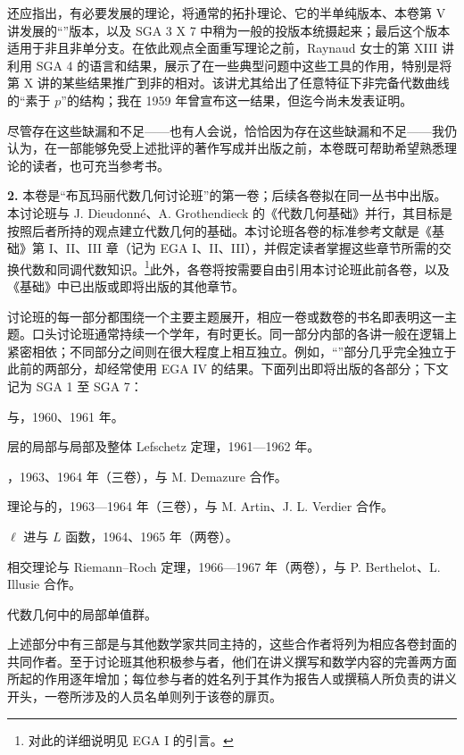还应指出，有必要发展的理论，将通常的拓扑理论、它的半单纯版本、本卷第 V 讲发展的“”版本，以及 SGA 3 X 7 中稍为一般的投版本统摄起来；最后这个版本适用于非且非单分支。在依此观点全面重写理论之前，Raynaud 女士的第 XIII 讲利用 SGA 4 的语言和结果，展示了在一些典型问题中这些工具的作用，特别是将第 X 讲的某些结果推广到非的相对。该讲尤其给出了任意特征下非完备代数曲线的“素于 $p$”的结构；我在 1959 年曾宣布这一结果，但迄今尚未发表证明。

尽管存在这些缺漏和不足——也有人会说，恰恰因为存在这些缺漏和不足——我仍认为，在一部能够免受上述批评的著作写成并出版之前，本卷既可帮助希望熟悉理论的读者，也可充当参考书。

\textbf{2.} 本卷是“布瓦玛丽代数几何讨论班”的第一卷；后续各卷拟在同一丛书中出版。本讨论班与 J. Dieudonné、A. Grothendieck 的《代数几何基础》并行，其目标是按照后者所持的观点建立代数几何的基础。本讨论班各卷的标准参考文献是《基础》第 I、II、III 章（记为 EGA I、II、III），并假定读者掌握这些章节所需的交换代数和同调代数知识。\footnote{对此的详细说明见 EGA I 的引言。}此外，各卷将按需要自由引用本讨论班此前各卷，以及《基础》中已出版或即将出版的其他章节。

讨论班的每一部分都围绕一个主要主题展开，相应一卷或数卷的书名即表明这一主题。口头讨论班通常持续一个学年，有时更长。同一部分内部的各讲一般在逻辑上紧密相依；不同部分之间则在很大程度上相互独立。例如，“”部分几乎完全独立于此前的两部分，却经常使用 EGA IV 的结果。下面列出即将出版的各部分；下文记为 SGA 1 至 SGA 7：
\begin{description}[style=nextline,leftmargin=1.8em]
\item[SGA 1.] 与，1960、1961 年。
\item[SGA 2.] 层的局部与局部及整体 Lefschetz 定理，1961—1962 年。
\item[SGA 3.] ，1963、1964 年（三卷），与 M. Demazure 合作。
\item[SGA 4.] 理论与的，1963—1964 年（三卷），与 M. Artin、J. L. Verdier 合作。
\item[SGA 5.] $\ell$ 进与 $L$ 函数，1964、1965 年（两卷）。
\item[SGA 6.] 相交理论与 Riemann–Roch 定理，1966—1967 年（两卷），与 P. Berthelot、L. Illusie 合作。
\item[SGA 7.] 代数几何中的局部单值群。
\end{description}
上述部分中有三部是与其他数学家共同主持的，这些合作者将列为相应各卷封面的共同作者。至于讨论班其他积极参与者，他们在讲义撰写和数学内容的完善两方面所起的作用逐年增加；每位参与者的姓名列于其作为报告人或撰稿人所负责的讲义开头，一卷所涉及的人员名单则列于该卷的扉页。


